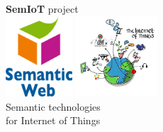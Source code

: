 \documentclass{beamer}
\begin{document}
    \begin{frame}
        \begin{center}
            \huge{\textbf{SemIoT} project}\\
            \includegraphics[height=3cm,keepaspectratio]{Semantic-Web-Logo-by-W3C}
            \includegraphics[height=3cm,keepaspectratio]{iot}\\
            Semantic technologies\\
            for Internet of Things
        \end{center}
        \small{}
        
    \end{frame}
\end{document}
